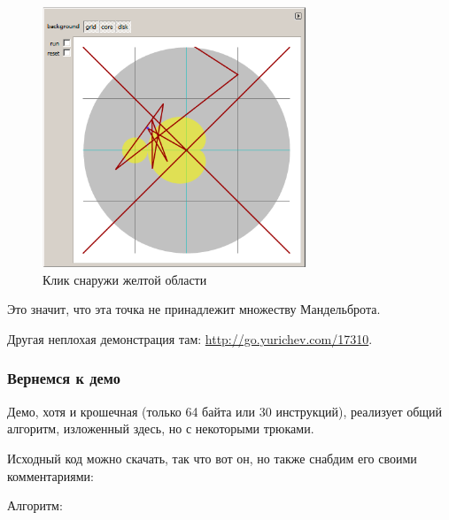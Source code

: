 \begin{figure}[H]
\centering
\includegraphics[width=0.7\textwidth]{examples/demos/mandelbrot/demo2.png}
\caption{Клик снаружи желтой области}
\end{figure}

Это значит, что эта точка не принадлежит множеству Мандельброта.

Другая неплохая демонстрация там: 
\url{http://go.yurichev.com/17310}.

\clearpage
\subsubsection{Вернемся к демо}

Демо, хотя и крошечная (только 64 байта или 30 инструкций), реализует общий алгоритм, изложенный
здесь, но с некоторыми трюками.


Исходный код можно скачать, так что вот он, но также снабдим его своими комментариями:



Алгоритм:

